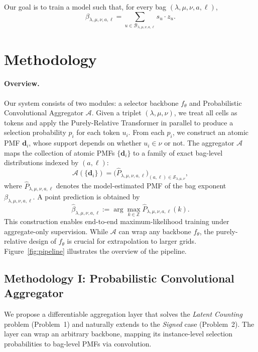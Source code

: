 \documentclass{article}
\theoremstyle{plain}
\theoremstyle{definition}
\theoremstyle{remark}
\begin{document}
    Our goal is to train a model such that, for every bag $(\lambda, \mu, \nu, a,\ell)$,
    \[
\beta_{\lambda,\mu,\nu,a,\ell}=\sum_{u\in\mathcal{B}_{\lambda, \mu, \nu, a,\ell}} s_u \cdot z_u .
    \]
    

\section{Methodology}
\paragraph{Overview.}
Our system consists of two modules: a selector backbone $f_\theta$ and Probabilistic Convolutional Aggregator $\mathcal{A}$.
Given a triplet $(\lambda,\mu,\nu)$, we treat all cells as tokens and apply the Purely-Relative Transformer in parallel to produce a selection probability $p_i$ for each token $u_i$.
From each $p_i$, we construct an atomic PMF $\mathbf d_i$, whose support depends on whether $u_i\in \nu$ or not.
The aggregator $\mathcal{A}$ maps the collection of atomic PMFs $\{\mathbf d_i\}$ to a family of exact bag-level distributions indexed by $(a,\ell)$:
\[
\mathcal{A}\!\left(\{\mathbf d_i\}\right)
=\Big(\hat{P}_{\lambda,\mu,\nu,a,\ell}\Big)_{(a,\ell)\in \mathcal S_{\lambda,\mu,\nu}},
\]
where $\hat{P}_{\lambda,\mu,\nu,a,\ell}$ denotes the model-estimated PMF of the bag exponent $\beta_{\lambda,\mu,\nu,a,\ell}$.
A point prediction is obtained by
\[
\widehat{\beta}_{\lambda,\mu,\nu,a,\ell}
:= \arg\max_{k\in\mathbb{Z}} \hat{P}_{\lambda,\mu,\nu,a,\ell}(k).
\]
This construction enables end-to-end maximum-likelihood training under aggregate-only supervision.
While $\mathcal{A}$ can wrap any backbone $f_\theta$, the purely-relative design of $f_\theta$ is crucial for extrapolation to larger grids.
Figure~\ref{fig:pipeline} illustrates the overview of the pipeline.

    



	\subsection{Methodology I: Probabilistic Convolutional Aggregator}
	\label{sec:method_conv}

    We propose a differentiable aggregation layer that solves the \textit{Latent Counting} problem (Problem~1) and naturally extends to the \textit{Signed} case (Problem~2). 
    The layer can wrap an arbitrary backbone, mapping its instance-level selection probabilities to bag-level PMFs via convolution.
\end{document}
